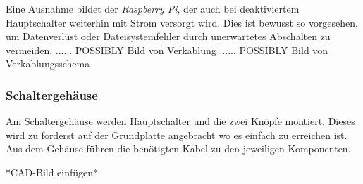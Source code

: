 Eine Ausnahme bildet der \textit{Raspberry Pi}, der auch bei deaktiviertem Hauptschalter weiterhin mit Strom versorgt wird. Dies ist bewusst so vorgesehen, um Datenverlust oder Dateisystemfehler durch unerwartetes Abschalten zu vermeiden.
...... POSSIBLY Bild von Verkablung
...... POSSIBLY Bild von Verkablungsschema

\subsubsection{Schaltergehäuse}

Am Schaltergehäuse werden Hauptschalter und die zwei Knöpfe montiert. Dieses wird zu forderst auf der Grundplatte angebracht wo es einfach zu erreichen ist. Aus dem Gehäuse führen die benötigten Kabel zu den jeweiligen Komponenten.



*CAD-Bild einfügen*

